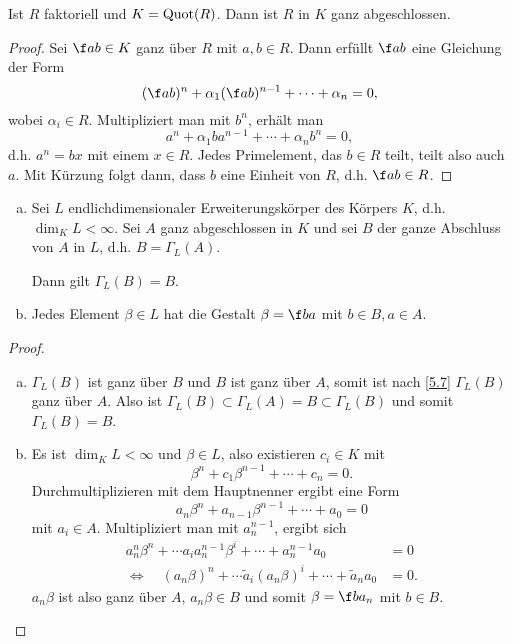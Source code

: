 \begin{lem} \label{5.8}
	Ist $R$ faktoriell und $K = \operatorname{Quot}(R)$.
	Dann ist $R$ in $K$ ganz abgeschlossen.
	\begin{proof}
		Sei $\f ab \in K$ ganz über $R$ mit $a,b \in R$.
		Dann erfüllt $\f ab$ eine Gleichung der Form
		\[
			(\f ab)^n + \alpha_1 (\f ab)^{n-1} + \dotsb + \alpha_n = 0,
		\]
		wobei $\alpha_i \in R$.
		Multipliziert man mit $b^n$, erhält man
		\[
			a^n + \alpha_1 b a^{n-1} + \dotsb + \alpha_n b^n = 0,
		\]
		d.h. $a^n = bx$ mit einem $x \in R$.
		Jedes Primelement, das $b \in R$ teilt, teilt also auch $a$.
		Mit Kürzung folgt dann, dass $b$ eine Einheit von $R$, d.h. $\f ab \in R$.
	\end{proof}
\end{lem}

\begin{nt} \label{5.9}
	\begin{enumerate}[a)]
		\item
			Sei $L$ endlichdimensionaler Erweiterungskörper des Körpers $K$, d.h. $\dim_K L < \infty$.
			Sei $A$ ganz abgeschlossen in $K$ und sei $B$ der ganze Abschluss von $A$ in $L$, d.h. $B = \Gamma_L(A)$.

			Dann gilt $\Gamma_L(B) = B$.
		\item
			Jedes Element $\beta \in L$ hat die Gestalt $\beta = \f ba$ mit $b \in B, a \in A$.			
	\end{enumerate}
	\begin{proof}
		\begin{enumerate}[a)]
			\item
				$\Gamma_L(B)$ ist ganz über $B$ und $B$ ist ganz über $A$, somit ist nach \ref{5.7} $\Gamma_L(B)$ ganz über $A$.
				Also ist $\Gamma_L(B) \subset \Gamma_L(A) = B \subset \Gamma_L(B)$ und somit $\Gamma_L(B) = B$.
			\item
				Es ist $\dim_K L < \infty$ und $\beta \in L$, also existieren $c_i \in K$ mit
				\[
					\beta^n + c_1 \beta^{n-1} + \dotsb + c_n = 0.
				\]
				Durchmultiplizieren mit dem Hauptnenner ergibt eine Form
				\[
					a_n \beta^n + a_{n-1} \beta^{n-1} + \dotsb + a_0 = 0
				\]
				mit $a_i \in A$.
				Multipliziert man mit $a_n^{n-1}$, ergibt sich
				\begin{align*}
					a_n^n \beta^n + \dotsb a_i a_n^{n-1} \beta^i + \dotsb + a_n^{n-1} a_0 &= 0 \\
					\iff \quad
					(a_n \beta)^n + \dotsb \tilde a_i (a_n \beta)^i + \dotsb + \tilde a_n a_0 &= 0.
				\end{align*}
				$a_n \beta$ ist also ganz über $A$, $a_n \beta \in B$ und somit $\beta = \f b{a_n}$ mit $b \in B$.
		\end{enumerate}
	\end{proof}
\end{nt}

